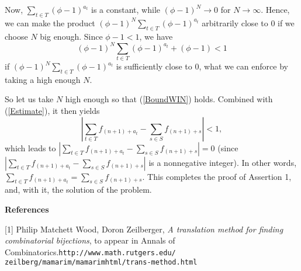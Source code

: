 \documentclass[12pt,final,notitlepage,onecolumn]{article}%
\begin{document}
Now, $\sum\limits_{t\in T}\left(  \phi-1\right)  ^{a_{t}}$ is a constant,
while $\left(  \phi-1\right)  ^{N}\rightarrow0$ for $N\rightarrow\infty$.
Hence, we can make the product $\left(  \phi-1\right)  ^{N}\sum\limits_{t\in
T}\left(  \phi-1\right)  ^{a_{t}}$ arbitrarily close to $0$ if we choose $N$
big enough. Since $\phi-1<1$, we have%
\begin{equation}
\left(  \phi-1\right)  ^{N}\sum\limits_{t\in T}\left(  \phi-1\right)  ^{a_{t}%
}+\left(  \phi-1\right)  <1 \label{BoundWIN}%
\end{equation}
if $\left(  \phi-1\right)  ^{N}\sum\limits_{t\in T}\left(  \phi-1\right)
^{a_{t}}$ is sufficiently close to $0$, what we can enforce by taking a high
enough $N$.

So let us take $N$ high enough so that (\ref{BoundWIN}) holds. Combined with
(\ref{Estimate}), it then yields%
\[
\left\vert \sum\limits_{t\in T}f_{\left(  n+1\right)  +a_{t}}-\sum
\limits_{s\in S}f_{\left(  n+1\right)  +s}\right\vert <1,
\]
which leads to $\left\vert \sum\limits_{t\in T}f_{\left(  n+1\right)  +a_{t}%
}-\sum\limits_{s\in S}f_{\left(  n+1\right)  +s}\right\vert =0$ (since
$\left\vert \sum\limits_{t\in T}f_{\left(  n+1\right)  +a_{t}}-\sum
\limits_{s\in S}f_{\left(  n+1\right)  +s}\right\vert $ is a nonnegative
integer). In other words, $\sum\limits_{t\in T}f_{\left(  n+1\right)  +a_{t}%
}=\sum\limits_{s\in S}f_{\left(  n+1\right)  +s}$. This completes the proof of
Assertion 1, and, with it, the solution of the problem.

\begin{center}
\textbf{References}
\end{center}

[1] Philip Matchett Wood, Doron Zeilberger, \textit{A translation method for
finding combinatorial bijections}, to appear in Annals of
Combinatorics.\newline\texttt{http://www.math.rutgers.edu/%
zeilberg/mamarim/mamarimhtml/trans-method.html}
\end{document}
